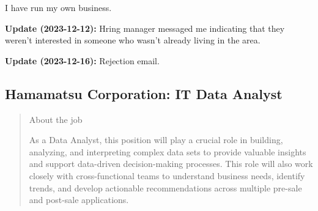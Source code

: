 \documentclass[
	letterpaper, %
	12pt, %
]{CSSullivanBusinessReport}
\begin{document}
I have run my own business.

\textbf{Update (2023-12-12):} Hring manager messaged me indicating that they weren't interested in someone who wasn't already living in the area.

\textbf{Update (2023-12-16):} Rejection email.


\subsection[Hamamatsu Corporation]{Hamamatsu Corporation: IT Data Analyst}

\begin{quote}
	About the job
	
	As a Data Analyst, this position will play a crucial role in building, analyzing, and interpreting complex data sets to provide valuable insights and support data-driven decision-making processes. This role will also work closely with cross-functional teams to understand business needs, identify trends, and develop actionable recommendations across multiple pre-sale and post-sale applications.

\end{quote}
\end{document}
